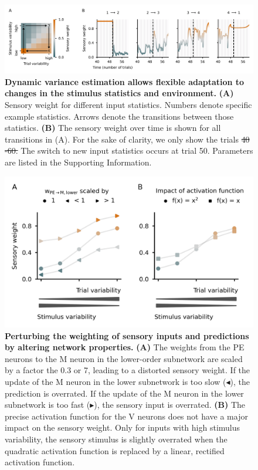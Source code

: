 \documentclass[10pt,a4paper]{article}
\providecommand{\DIFaddtex}[1]{{\protect\color{blue}\uwave{#1}}} %
\providecommand{\DIFdeltex}[1]{{\protect\color{red}\sout{#1}}}                      %
\providecommand{\DIFaddFL}[1]{\DIFadd{#1}} %
\providecommand{\DIFdelFL}[1]{\DIFdel{#1}} %
\providecommand{\DIFaddbeginFL}{} %
\providecommand{\DIFaddendFL}{} %
\providecommand{\DIFdelbeginFL}{} %
\providecommand{\DIFdelendFL}{} %
\providecommand{\DIFadd}[1]{\texorpdfstring{\DIFaddtex{#1}}{#1}} %
\providecommand{\DIFdel}[1]{\texorpdfstring{\DIFdeltex{#1}}{}} %
\newcommand{\DIFscaledelfig}{0.5}
\newlength{\DIFdelgraphicswidth} %
\newlength{\DIFdelgraphicsheight} %
\newcommand{\DIFaddincludegraphics}[2][]{{\color{blue}\fbox{\DIFOincludegraphics[#1]{#2}}}} %
\newcommand{\DIFdelincludegraphics}[2][]{%
\sbox{\DIFdelgraphicsbox}{\DIFOincludegraphics[#1]{#2}}%
\settoboxwidth{\DIFdelgraphicswidth}{\DIFdelgraphicsbox} %
\settoboxtotalheight{\DIFdelgraphicsheight}{\DIFdelgraphicsbox} %
\scalebox{\DIFscaledelfig}{%
\parbox[b]{\DIFdelgraphicswidth}{\usebox{\DIFdelgraphicsbox}\\[-\baselineskip] \rule{\DIFdelgraphicswidth}{0em}}\llap{\resizebox{\DIFdelgraphicswidth}{\DIFdelgraphicsheight}{%
\setlength{\unitlength}{\DIFdelgraphicswidth}%
\begin{picture}(1,1)%
\thicklines\linethickness{2pt} %
{\color[rgb]{1,0,0}\put(0,0){\framebox(1,1){}}}%
{\color[rgb]{1,0,0}\put(0,0){\line( 1,1){1}}}%
{\color[rgb]{1,0,0}\put(0,1){\line(1,-1){1}}}%
\end{picture}%
}\hspace*{3pt}}} %
} %
\DeclareRobustCommand{\DIFaddbeginFL}{\DIFOaddbeginFL \let\includegraphics\DIFaddincludegraphics} %
\DeclareRobustCommand{\DIFaddendFL}{\DIFOaddendFL \let\includegraphics\DIFOincludegraphics} %
\DeclareRobustCommand{\DIFdelbeginFL}{\DIFOdelbeginFL \let\includegraphics\DIFdelincludegraphics} %
\DeclareRobustCommand{\DIFdelendFL}{\DIFOaddendFL \let\includegraphics\DIFOincludegraphics} %
\begin{document}
\begin{figure}[!h]
	\centering
    \includegraphics{../results/figures/final/Fig_3_S1}%
\caption{\footnotesize{\bf Dynamic variance estimation allows flexible adaptation to changes in the stimulus statistics and environment. \newline}  
{\bf (A)} Sensory weight for different input statistics. Numbers denote specific example statistics. Arrows denote the transitions between those statistics.
{\bf (B)} The sensory weight over time is shown for all transitions in (A). For the sake of clarity, we only show the trials \DIFdelbeginFL \DIFdelFL{40 -60. }\DIFdelendFL \DIFaddbeginFL \DIFaddFL{40-60. }\DIFaddendFL The switch to new input statistics occurs at trial 50. Parameters are listed in the Supporting Information.
}
\label{fig:Fig_3_S1}
\end{figure}


\begin{figure}[!h]
	\centering
    \includegraphics{../results/figures/final/Fig_3_S2}%
\caption{\footnotesize{\bf Perturbing the weighting of sensory inputs and predictions by altering network properties. \newline}  
{\bf (A)} The weights from the PE neurons to the M neuron in the lower-order subnetwork are scaled by a factor the 0.3 or 7, leading to a distorted sensory weight. If the update of the M neuron in the lower subnetwork is too slow ($\blacktriangleleft$), the prediction is overrated. If the update of the M neuron in the lower subnetwork is too fast ($\blacktriangleright$), the sensory input is overrated.
{\bf (B)} The precise activation function for the V neurons does not have a major impact on the sensory weight. Only for inputs with high stimulus variability, the sensory stimulus is slightly overrated when the quadratic activation function is replaced by a linear, rectified activation function.
}
\label{fig:Fig_3_S2}
\end{figure}
\end{document}
